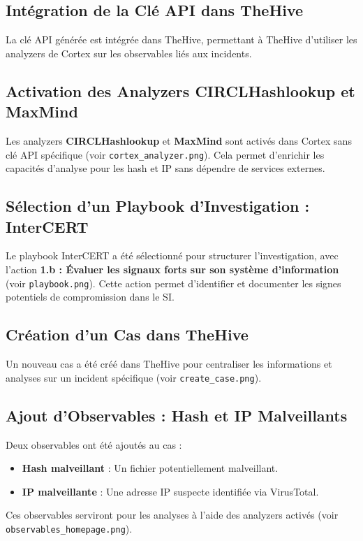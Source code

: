 \documentclass{article}
\begin{document}
\subsection{Intégration de la Clé API dans TheHive}
La clé API générée est intégrée dans TheHive, permettant à TheHive d’utiliser les analyzers de Cortex sur les observables liés aux incidents.

\subsection{Activation des Analyzers CIRCLHashlookup et MaxMind}
Les analyzers \textbf{CIRCLHashlookup} et \textbf{MaxMind} sont activés dans Cortex sans clé API spécifique (voir \texttt{cortex\_analyzer.png}). Cela permet d’enrichir les capacités d’analyse pour les hash et IP sans dépendre de services externes.

\subsection{Sélection d'un Playbook d'Investigation : InterCERT}
Le playbook InterCERT a été sélectionné pour structurer l'investigation, avec l'action \textbf{1.b : Évaluer les signaux forts sur son système d’information} (voir \texttt{playbook.png}). Cette action permet d’identifier et documenter les signes potentiels de compromission dans le SI.

\subsection{Création d’un Cas dans TheHive}
Un nouveau cas a été créé dans TheHive pour centraliser les informations et analyses sur un incident spécifique (voir \texttt{create\_case.png}).

\subsection{Ajout d’Observables : Hash et IP Malveillants}
Deux observables ont été ajoutés au cas :
\begin{itemize}
    \item \textbf{Hash malveillant} : Un fichier potentiellement malveillant.
    \item \textbf{IP malveillante} : Une adresse IP suspecte identifiée via VirusTotal.
\end{itemize}
Ces observables serviront pour les analyses à l’aide des analyzers activés (voir \texttt{observables\_homepage.png}).
\end{document}
